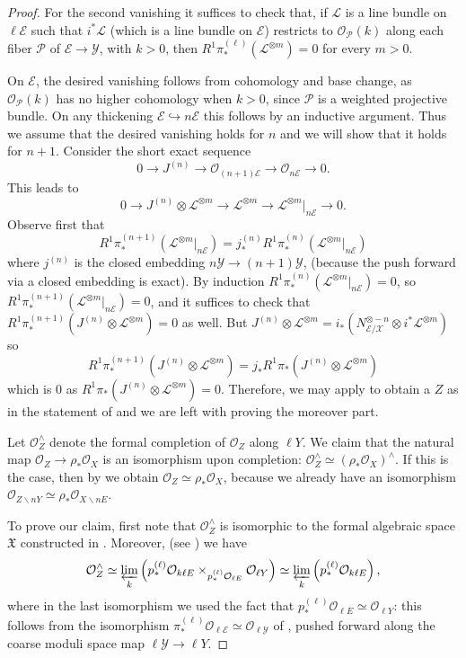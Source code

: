 \documentclass{amsart}
\newcommand{\cE}{\mathcal{E}}
\newcommand{\cL}{\mathcal{L}}
\newcommand{\cO}{\mathcal{O}}
\newcommand{\cP}{\mathcal{P}}
\newcommand{\cX}{\mathcal{X}}
\newcommand{\cY}{\mathcal{Y}}
\theoremstyle{definition}
\begin{document}
\begin{proof}
     For the second vanishing it suffices to check that, if $\cL$ is a line bundle on $\ell \cE$ such that $i^*\cL$ (which is a line bundle on $\cE$) restricts to $\cO_\cP(k)$ along each fiber $\cP$ of $\cE\to \cY$, with $k>0$, then $R^1\pi^{(\ell)}_*(\cL^{\otimes m}) = 0$ for every $m>0$. 
     
     
    On $\cE$, the desired vanishing follows from cohomology and base change, as $\cO_{\cP}(k)$ has no higher cohomology when $k>0$, since $\cP$ is a weighted projective bundle. On any thickening $\cE \hookrightarrow n\cE$ this follows by an inductive argument. Thus we assume that the desired vanishing holds for $n$ and we will show that it holds for $n+1$. Consider the short exact sequence
     $$0\to J^{(n)}\to \cO_{(n+1)\cE}\to \cO_{n\cE}\to 0.$$
     This leads to 
     $$0\to J^{(n)}\otimes \cL^{\otimes m}\to \cL^{\otimes m}\to \cL^{\otimes m}|_{n\cE}\to 0.$$
     Observe first that $$R^1\pi^{(n+1)}_*(\cL^{\otimes m}|_{n\cE})=j^{(n)}_*R^1\pi^{(n)}_*(\cL^{\otimes m}|_{n\cE})$$ where $j^{(n)}$ is the closed embedding $n\cY\to (n+1)\cY$, (because the push forward via a closed embedding is exact). By induction $R^1\pi^{(n)}_*(\cL^{\otimes m}|_{n\cE})=0$, so $R^1\pi^{(n+1)}_*(\cL^{\otimes m}|_{n\cE})=0$, and it suffices to check that $R^1\pi_*^{(n+1)}(J^{(n)}\otimes \cL^{\otimes m})=0$ as well. But $J^{(n)}\otimes \cL^{\otimes m} = i_*(N_{\cE/\cX}^{\otimes -n}\otimes i^*\cL^{\otimes m})$ so
     $$R^1\pi_*^{(n+1)}(J^{(n)}\otimes \cL^{\otimes m}) = j_*R^1\pi_*(J^{(n)}\otimes \cL^{\otimes m})$$ which is 0 as $R^1\pi_*(J^{(n)}\otimes \cL^{\otimes m})=0$. Therefore, we may apply \cite[Cor. 6.10]{artin1970algebraization} to obtain a $Z$ as in the statement of  and we are left with proving the moreover part.

     Let $\cO_Z^{\wedge}$ denote the formal completion of $\cO_Z$ along $\ell Y$. We claim that the natural map $\cO_Z \to \rho_*\cO_X$ is an isomorphism upon completion: $\cO_Z^\wedge\simeq (\rho_*\cO_X)^\wedge$. If this is the case, then by \cite[Thm. 2.2]{artin1970algebraization} we obtain $\cO_Z \simeq \rho_*\cO_X$, because we already have an isomorphism $\cO_{Z\smallsetminus nY} \simeq \rho_*\cO_{X\smallsetminus nE}$.

     To prove our claim, first note that $\cO_Z^{\wedge}$ is isomorphic to the formal algebraic space $\mathfrak{X}$ constructed in \cite[Thm. 3.1, Thm. 6.2]{artin1970algebraization}. Moreover, (see \cite[Lem. 6.5]{artin1970algebraization}) we have 
     \[\cO_Z^{\wedge} \simeq \varprojlim_k \left(p^{(\ell)}_*\cO_{k\ell E}\times_{p_*^{(\ell)}\cO_{\ell E}} \cO_{\ell Y} \right) \simeq  \varprojlim_k\left(p^{(\ell)}_*\cO_{k\ell E} \right),\]
     where in the last isomorphism we used the fact that $p_*^{(\ell)}\cO_{\ell E} \simeq \cO_{\ell Y}$: this follows from the isomorphism $\pi^{(\ell)}_*\cO_{\ell\cE} \simeq \cO_{\ell\cY}$ of , pushed forward along the coarse moduli space map $\ell\cY\to \ell Y$.


\end{proof}
\end{document}
